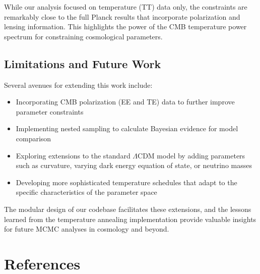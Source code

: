 \documentclass[11pt]{article}
\theoremstyle{definition}
\begin{document}
While our analysis focused on temperature (TT) data only, the constraints are remarkably close to the full Planck results that incorporate polarization and lensing information. This highlights the power of the CMB temperature power spectrum for constraining cosmological parameters.

\subsection{Limitations and Future Work}

Several avenues for extending this work include:

\begin{itemize}
  \item Incorporating CMB polarization (EE and TE) data to further improve parameter constraints
  
  \item Implementing nested sampling to calculate Bayesian evidence for model comparison
  
  \item Exploring extensions to the standard $\Lambda$CDM model by adding parameters such as curvature, varying dark energy equation of state, or neutrino masses
  
  \item Developing more sophisticated temperature schedules that adapt to the specific characteristics of the parameter space
\end{itemize}

The modular design of our codebase facilitates these extensions, and the lessons learned from the temperature annealing implementation provide valuable insights for future MCMC analyses in cosmology and beyond.

\section{References}
\end{document}

